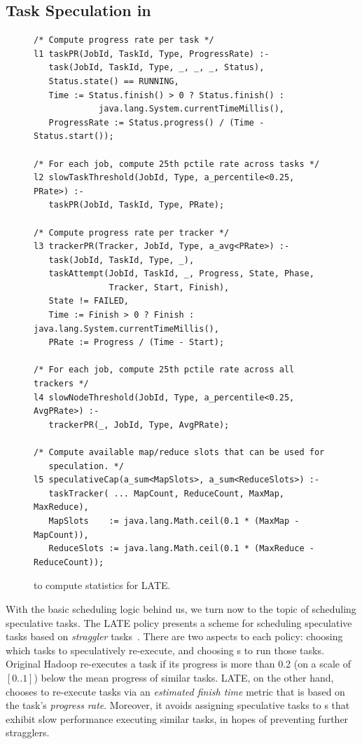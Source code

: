 \subsection{Task Speculation in \OVERLOG}
\label{ch:boom:sec:late}

\begin{figure}[p]
\ssp
\begin{lstlisting}
/* Compute progress rate per task */
l1 taskPR(JobId, TaskId, Type, ProgressRate) :-
   task(JobId, TaskId, Type, _, _, _, Status),
   Status.state() == RUNNING,
   Time := Status.finish() > 0 ? Status.finish() : 
             java.lang.System.currentTimeMillis(),
   ProgressRate := Status.progress() / (Time - Status.start());

/* For each job, compute 25th pctile rate across tasks */
l2 slowTaskThreshold(JobId, Type, a_percentile<0.25, PRate>) :-
   taskPR(JobId, TaskId, Type, PRate);

/* Compute progress rate per tracker */
l3 trackerPR(Tracker, JobId, Type, a_avg<PRate>) :- 
   task(JobId, TaskId, Type, _),
   taskAttempt(JobId, TaskId, _, Progress, State, Phase, 
               Tracker, Start, Finish),
   State != FAILED,
   Time := Finish > 0 ? Finish : java.lang.System.currentTimeMillis(),
   PRate := Progress / (Time - Start);

/* For each job, compute 25th pctile rate across all trackers */
l4 slowNodeThreshold(JobId, Type, a_percentile<0.25, AvgPRate>) :-
   trackerPR(_, JobId, Type, AvgPRate);

/* Compute available map/reduce slots that can be used for 
   speculation. */
l5 speculativeCap(a_sum<MapSlots>, a_sum<ReduceSlots>) :-
   taskTracker( ... MapCount, ReduceCount, MaxMap, MaxReduce),
   MapSlots    := java.lang.Math.ceil(0.1 * (MaxMap - MapCount)),
   ReduceSlots := java.lang.Math.ceil(0.1 * (MaxReduce - ReduceCount));
\end{lstlisting}
\caption{\OVERLOG to compute statistics for LATE.}
\label{fig:latePolicy}
\end{figure}

With the basic scheduling logic behind us, we turn now to the topic of
scheduling speculative tasks.  The LATE policy presents a scheme for scheduling
speculative tasks based on {\em straggler} tasks~\cite{zaharia-late}.  There
are two aspects to each policy: choosing which tasks to speculatively
re-execute, and choosing {\TT}s to run those tasks.  Original Hadoop
re-executes a task if its progress is more than 0.2 (on a scale of $[0..1]$)
below the mean progress of similar tasks.  LATE, on the other hand, chooses to
re-execute tasks via an {\em estimated finish time} metric that is based on the
task's {\em progress rate}.  Moreover, it avoids assigning speculative tasks to
{\TT}s that exhibit slow performance executing similar tasks, in hopes of
preventing further stragglers.

